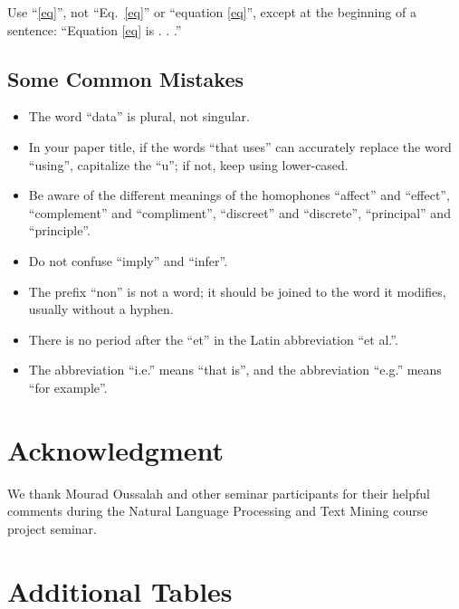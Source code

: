 \documentclass[conference]{IEEEtran}
\begin{document}
Use ``\eqref{eq}'', not ``Eq.~\eqref{eq}'' or ``equation \eqref{eq}'', except at 
the beginning of a sentence: ``Equation \eqref{eq} is . . .''

\subsection{Some Common Mistakes}\label{SCM}
\begin{itemize}
\item The word ``data'' is plural, not singular.
\item In your paper title, if the words ``that uses'' can accurately replace the word ``using'', capitalize the ``u''; if not, keep using lower-cased.
\item Be aware of the different meanings of the homophones ``affect'' and ``effect'', ``complement'' and ``compliment'', ``discreet'' and ``discrete'', ``principal'' and ``principle''.
\item Do not confuse ``imply'' and ``infer''.
\item The prefix ``non'' is not a word; it should be joined to the word it modifies, usually without a hyphen.
\item There is no period after the ``et'' in the Latin abbreviation ``et al.''.
\item The abbreviation ``i.e.'' means ``that is'', and the abbreviation ``e.g.'' means ``for example''.
\end{itemize}




\section*{Acknowledgment}

We thank Mourad Oussalah and other seminar participants for their helpful comments during
 the Natural Language Processing and Text Mining course project seminar.




\appendices
\section{Additional Tables}
 \label{FirstAppendix}
\end{document}

